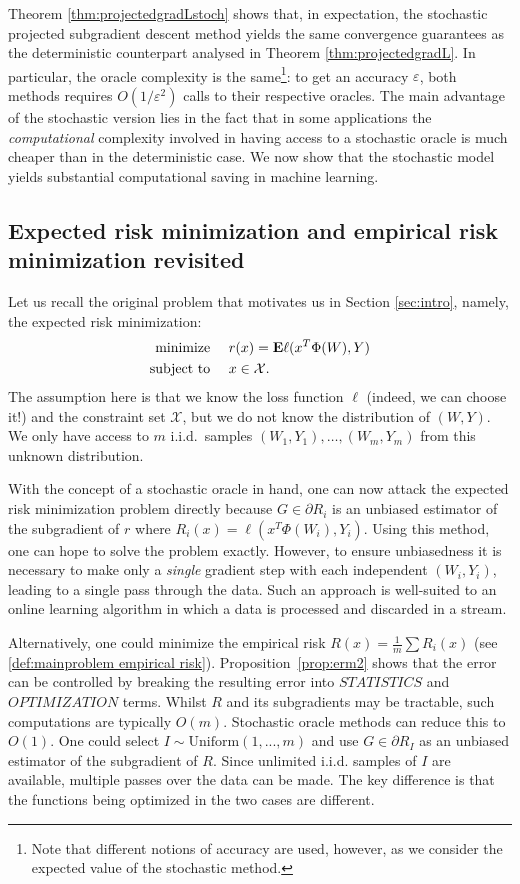 Theorem \ref{thm:projectedgradLstoch} shows that, in expectation, the stochastic projected subgradient descent method yields the same convergence guarantees as the deterministic counterpart analysed in Theorem \ref{thm:projectedgradL}.  In particular, the oracle complexity is the same\footnote{Note that different notions of accuracy are used, however, as we consider the expected value of the stochastic method.}: to get an accuracy $\varepsilon$, both methods requires $O(1/\varepsilon^2)$ calls to their respective oracles. The main advantage of the stochastic version lies in the fact that in some applications the \emph{computational} complexity involved in having access to a stochastic oracle is much cheaper than in the deterministic case. We now show that the stochastic model yields substantial computational saving in machine learning.

\subsection{Expected risk minimization and empirical risk minimization revisited}
Let us recall the original problem that motivates us in Section \ref{sec:intro}, namely, the expected risk minimization:
\begin{align*}
	\begin{aligned}
		\text{minimize }\quad   & r(x) = \mathbf{E}\ell(x^T\Phi(W),Y) \\
		\text{subject to }\quad & x\in \mathcal{X}.
	\end{aligned}
\end{align*}
The assumption here is that we know the loss function $\ell$ (indeed, we can choose it!) and the constraint set $\mathcal{X}$, but we do not know the distribution of $(W,Y)$. We only have access to $m$ i.i.d.\ samples $(W_1,Y_1),\ldots,(W_m,Y_m)$ from this unknown distribution.

With the concept of a stochastic oracle in hand, one can now attack the expected risk minimization problem directly because $G \in \partial R_i$ is an unbiased estimator of the subgradient of $r$ where $R_i(x) = \ell(x^T\Phi(W_i), Y_i)$. Using this method, one can hope to solve the problem exactly. However, to ensure unbiasedness it is necessary to make only a \textit{single} gradient step with each independent $(W_i, Y_i)$, leading to a single pass through the data. Such an approach is well-suited to an online learning algorithm in which a data is processed and discarded in a stream.

Alternatively, one could minimize the empirical risk $R(x) = \frac{1}{m}\sum R_i(x)$ (see \eqref{def:mainproblem empirical risk}). Proposition~\ref{prop:erm2} shows that the error can be controlled by breaking the resulting error into $STATISTICS$ and $OPTIMIZATION$ terms. Whilst $R$ and its subgradients may be tractable, such computations are typically $O(m)$. Stochastic oracle methods can reduce this to $O(1)$. One could select $I \sim \text{Uniform}(1, ..., m)$ and use $G \in \partial R_I$ as an unbiased estimator of the subgradient of $R$. Since unlimited i.i.d. samples of $I$ are available, multiple passes over the data can be made. The key difference is that the functions being optimized in the two cases are different.

